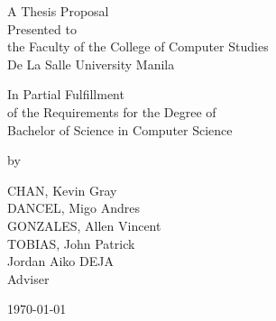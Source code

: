 %
%
%                 

\begin{titlepage}
\centering



\vspace{1.75cm}
A Thesis Proposal\\
Presented to\\
the Faculty of the College of Computer Studies\\
De La Salle University Manila

\vspace{1.75cm}
In Partial Fulfillment\\
of the Requirements for the Degree of\\
Bachelor of  Science in Computer Science

\vspace{1.75cm}
by\\
\vspace{1cm}

CHAN, Kevin Gray \\
DANCEL, Migo Andres  \\
GONZALES, Allen Vincent  \\
TOBIAS, John Patrick  \\

\vspace{1.75cm}
Jordan Aiko DEJA \\
Adviser

\vspace{1.75cm}
\today
\end{titlepage}
